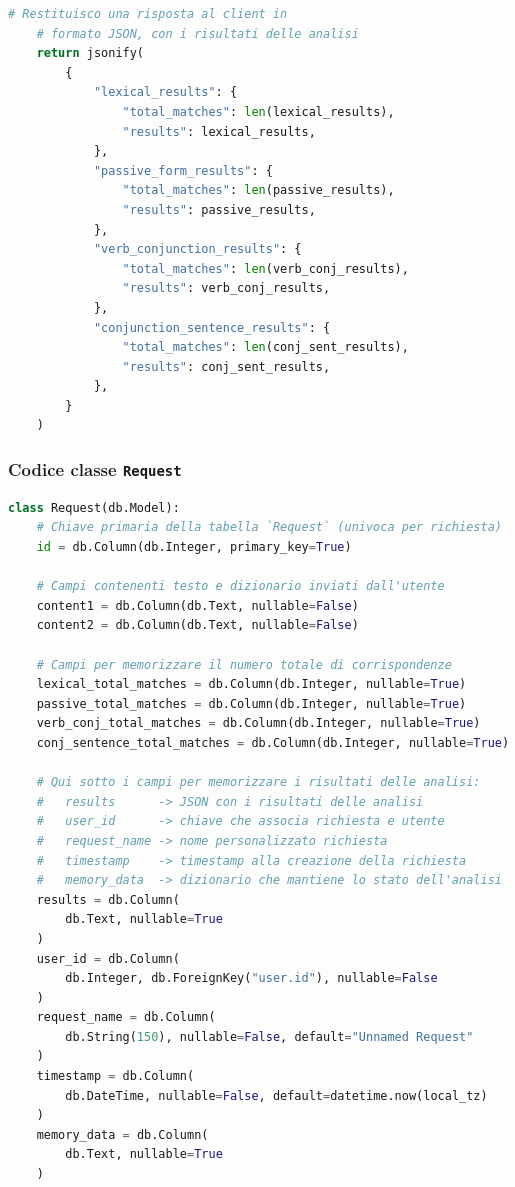 \documentclass[12pt]{report}
\begin{document}
\begin{lstlisting}[language=Python]
    # Restituisco una risposta al client in
    # formato JSON, con i risultati delle analisi
    return jsonify(
        {
            "lexical_results": {
                "total_matches": len(lexical_results),
                "results": lexical_results,
            },
            "passive_form_results": {
                "total_matches": len(passive_results),
                "results": passive_results,
            },
            "verb_conjunction_results": {
                "total_matches": len(verb_conj_results),
                "results": verb_conj_results,
            },
            "conjunction_sentence_results": {
                "total_matches": len(conj_sent_results),
                "results": conj_sent_results,
            },
        }
    )
\end{lstlisting}


\newpage
\subsubsection{Codice classe \texttt{Request}}
\begin{lstlisting}[language=Python]
class Request(db.Model):
    # Chiave primaria della tabella `Request` (univoca per richiesta)
    id = db.Column(db.Integer, primary_key=True)

    # Campi contenenti testo e dizionario inviati dall'utente
    content1 = db.Column(db.Text, nullable=False)
    content2 = db.Column(db.Text, nullable=False)

    # Campi per memorizzare il numero totale di corrispondenze
    lexical_total_matches = db.Column(db.Integer, nullable=True)
    passive_total_matches = db.Column(db.Integer, nullable=True)
    verb_conj_total_matches = db.Column(db.Integer, nullable=True)
    conj_sentence_total_matches = db.Column(db.Integer, nullable=True)

    # Qui sotto i campi per memorizzare i risultati delle analisi:
    #   results      -> JSON con i risultati delle analisi
    #   user_id      -> chiave che associa richiesta e utente
    #   request_name -> nome personalizzato richiesta
    #   timestamp    -> timestamp alla creazione della richiesta
    #   memory_data  -> dizionario che mantiene lo stato dell'analisi
    results = db.Column(
        db.Text, nullable=True
    )
    user_id = db.Column(
        db.Integer, db.ForeignKey("user.id"), nullable=False
    )
    request_name = db.Column(
        db.String(150), nullable=False, default="Unnamed Request"
    )
    timestamp = db.Column(
        db.DateTime, nullable=False, default=datetime.now(local_tz)
    )
    memory_data = db.Column(
        db.Text, nullable=True
    )
\end{lstlisting}
\end{document}
